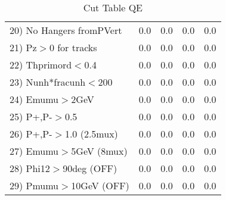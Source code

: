 \begin{table}[h!]
\begin{tabular}{||l||r|r|r|r||}
 20) No Hangers fromPVert &         0.0 &         0.0 &         0.0 &         0.0 \\
 21) Pz$>$0 for tracks    &         0.0 &         0.0 &         0.0 &         0.0 \\
 22) Thprimord$<$0.4      &         0.0 &         0.0 &         0.0 &         0.0 \\
 23) Nunh*fracunh$<$200   &         0.0 &         0.0 &         0.0 &         0.0 \\
 24) Emumu$>$2GeV         &         0.0 &         0.0 &         0.0 &         0.0 \\
 25) P+,P-$>$0.5          &         0.0 &         0.0 &         0.0 &         0.0 \\
 26) P+,P-$>$1.0 (2.5mux) &         0.0 &         0.0 &         0.0 &         0.0 \\
 27) Emumu$>$5GeV  (8mux) &         0.0 &         0.0 &         0.0 &         0.0 \\
 28) Phi12$>$90deg  (OFF) &         0.0 &         0.0 &         0.0 &         0.0 \\
 29) Pmumu$>$10GeV  (OFF) &         0.0 &         0.0 &         0.0 &         0.0 \\
 \hline
 \hline
 \end{tabular}
 \caption{Cut Table  QE     }
 \label{tab-cut____qe}
 \end{table}
